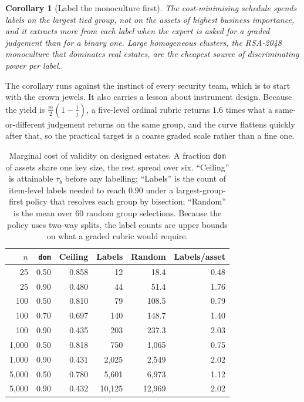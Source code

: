 \documentclass[journal,10pt]{IEEEtran}
\newtheorem{corollary}{Corollary}
\newcommand{\tb}{\tau_b}
\begin{document}
\begin{corollary}[Label the monoculture first]
\label{cor:policy}
The cost-minimising schedule spends labels on the largest tied group, not on the assets of highest
business importance, and it extracts more from each label when the expert is asked for a graded
judgement than for a binary one. Large homogeneous clusters, the RSA-2048 monoculture that dominates
real estates, are the cheapest source of discriminating power per label.
\end{corollary}

The corollary runs against the instinct of every security team, which is to start with the crown
jewels. It also carries a lesson about instrument design. Because the yield is
$\frac{m}{2}(1-\frac{1}{j})$, a five-level ordinal rubric returns $1.6$ times what a
same-or-different judgement returns on the same group, and the curve flattens quickly after that, so
the practical target is a coarse graded scale rather than a fine one.

\begin{table}[t]
\centering
\caption{Marginal cost of validity on designed estates. A fraction \texttt{dom} of assets share one
key size, the rest spread over six. ``Ceiling'' is attainable $\tb$ before any labelling;
``Labels'' is the count of item-level labels needed to reach $0.90$ under a largest-group-first
policy that resolves each group by bisection; ``Random'' is the mean over 60 random group
selections. Because the policy uses two-way splits, the label counts are upper bounds on what a
graded rubric would require.}
\label{tab:labelling}
\footnotesize
\begin{tabular}{rrrrrr}
\toprule
$n$ & \texttt{dom} & Ceiling & Labels & Random & Labels/asset \\
\midrule
25  & 0.50 & 0.858 & 12    & 18.4  & 0.48 \\
25  & 0.90 & 0.480 & 44    & 51.4  & 1.76 \\
100 & 0.50 & 0.810 & 79    & 108.5 & 0.79 \\
100 & 0.70 & 0.697 & 140   & 148.7 & 1.40 \\
100 & 0.90 & 0.435 & 203   & 237.3 & 2.03 \\
1{,}000 & 0.50 & 0.818 & 750   & 1{,}065 & 0.75 \\
1{,}000 & 0.90 & 0.431 & 2{,}025 & 2{,}549 & 2.02 \\
5{,}000 & 0.50 & 0.780 & 5{,}601 & 6{,}973 & 1.12 \\
5{,}000 & 0.90 & 0.432 & 10{,}125 & 12{,}969 & 2.02 \\
\bottomrule
\end{tabular}
\end{table}
\end{document}
